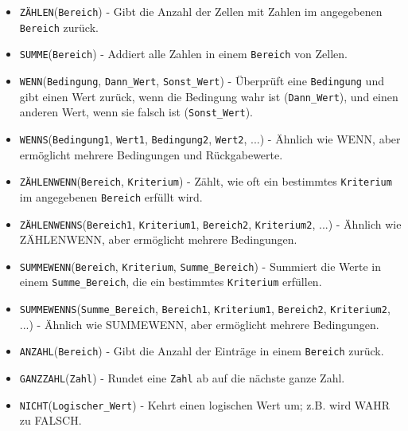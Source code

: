\documentclass[11pt, oneside]{book}
\begin{document}
\begin{itemize}
    \item \texttt{ZÄHLEN}(\texttt{Bereich}) - Gibt die Anzahl der Zellen mit Zahlen im angegebenen \texttt{Bereich} zurück.
    
    \item \texttt{SUMME}(\texttt{Bereich}) - Addiert alle Zahlen in einem \texttt{Bereich} von Zellen.
    
    \item \texttt{WENN}(\texttt{Bedingung}, \texttt{Dann\_Wert}, \texttt{Sonst\_Wert}) - Überprüft eine \texttt{Bedingung} und gibt einen Wert zurück, wenn die Bedingung wahr ist (\texttt{Dann\_Wert}), und einen anderen Wert, wenn sie falsch ist (\texttt{Sonst\_Wert}).
    
    \item \texttt{WENNS}(\texttt{Bedingung1}, \texttt{Wert1}, \texttt{Bedingung2}, \texttt{Wert2}, ...) - Ähnlich wie WENN, aber ermöglicht mehrere Bedingungen und Rückgabewerte.
    
    \item \texttt{ZÄHLENWENN}(\texttt{Bereich}, \texttt{Kriterium}) - Zählt, wie oft ein bestimmtes \texttt{Kriterium} im angegebenen \texttt{Bereich} erfüllt wird.
    
    \item \texttt{ZÄHLENWENNS}(\texttt{Bereich1}, \texttt{Kriterium1}, \texttt{Bereich2}, \texttt{Kriterium2}, ...) - Ähnlich wie ZÄHLENWENN, aber ermöglicht mehrere Bedingungen.
    
    \item \texttt{SUMMEWENN}(\texttt{Bereich}, \texttt{Kriterium}, \texttt{Summe\_Bereich}) - Summiert die Werte in einem \texttt{Summe\_Bereich}, die ein bestimmtes \texttt{Kriterium} erfüllen.
    
    \item \texttt{SUMMEWENNS}(\texttt{Summe\_Bereich}, \texttt{Bereich1}, \texttt{Kriterium1}, \texttt{Bereich2}, \texttt{Kriterium2}, ...) - Ähnlich wie SUMMEWENN, aber ermöglicht mehrere Bedingungen.
    
    \item \texttt{ANZAHL}(\texttt{Bereich}) - Gibt die Anzahl der Einträge in einem \texttt{Bereich} zurück.
    
    \item \texttt{GANZZAHL}(\texttt{Zahl}) - Rundet eine \texttt{Zahl} ab auf die nächste ganze Zahl.
    
    \item \texttt{NICHT}(\texttt{Logischer\_Wert}) - Kehrt einen logischen Wert um; z.B. wird WAHR zu FALSCH.
    

\end{itemize}
\end{document}
